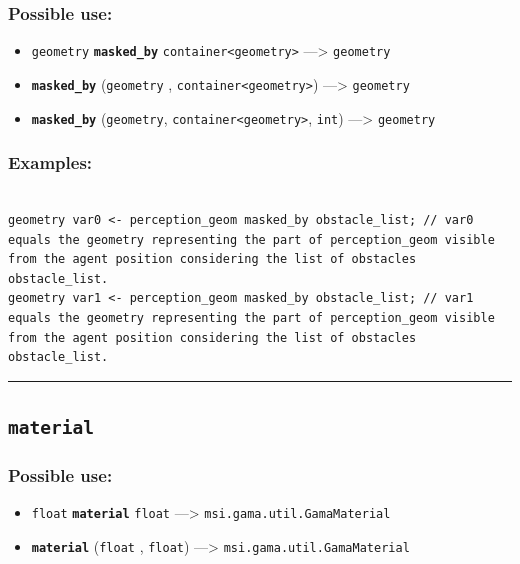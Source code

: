 \documentclass[]{book}
\providecommand{\tightlist}{%
  \setlength{\itemsep}{0pt}\setlength{\parskip}{0pt}}
\theoremstyle{definition}
\theoremstyle{definition}
\theoremstyle{definition}
\theoremstyle{remark}
\begin{document}
\subsubsection{Possible use:}\label{possible-use-334}

\begin{itemize}
\tightlist
\item
  \texttt{geometry} \textbf{\texttt{masked\_by}}
  \texttt{container\textless{}geometry\textgreater{}} ---\textgreater{}
  \texttt{geometry}
\item
  \textbf{\texttt{masked\_by}} (\texttt{geometry} ,
  \texttt{container\textless{}geometry\textgreater{}}) ---\textgreater{}
  \texttt{geometry}
\item
  \textbf{\texttt{masked\_by}} (\texttt{geometry},
  \texttt{container\textless{}geometry\textgreater{}}, \texttt{int})
  ---\textgreater{} \texttt{geometry}
\end{itemize}

\subsubsection{Examples:}\label{examples-231}

\begin{verbatim}
 
geometry var0 <- perception_geom masked_by obstacle_list; // var0 equals the geometry representing the part of perception_geom visible from the agent position considering the list of obstacles obstacle_list. 
geometry var1 <- perception_geom masked_by obstacle_list; // var1 equals the geometry representing the part of perception_geom visible from the agent position considering the list of obstacles obstacle_list.
\end{verbatim}

\begin{center}\rule{0.5\linewidth}{\linethickness}\end{center}

\subsection{\texorpdfstring{\texttt{material}}{material}}\label{material-1}

\subsubsection{Possible use:}\label{possible-use-335}

\begin{itemize}
\tightlist
\item
  \texttt{float} \textbf{\texttt{material}} \texttt{float}
  ---\textgreater{} \texttt{msi.gama.util.GamaMaterial}
\item
  \textbf{\texttt{material}} (\texttt{float} , \texttt{float})
  ---\textgreater{} \texttt{msi.gama.util.GamaMaterial}
\end{itemize}
\end{document}
